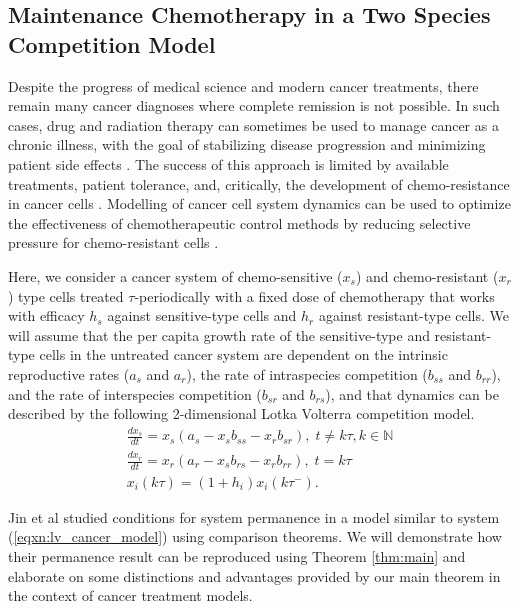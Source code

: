 \documentclass{article}
\theoremstyle{definition}
\newcommand{\N}{{\mathbb{N}}}
\begin{document}
\subsection{Maintenance Chemotherapy in a Two Species Competition Model}
Despite the progress of medical science and modern cancer treatments, there remain many cancer diagnoses where complete remission is not possible. In such cases, drug and radiation therapy can sometimes be used to manage cancer as a chronic illness, with the goal of stabilizing disease progression and minimizing patient side effects \cite{lee_maintenance_chemo_2014}. The success of this approach is limited by available treatments, patient tolerance, and, critically, the development of chemo-resistance in cancer cells \cite{strobl_cost_of_resistance_2021, enriquez_adaptivetherapy_2015}. Modelling of cancer cell system dynamics can be used to optimize the effectiveness of chemotherapeutic control methods by reducing selective pressure for chemo-resistant cells \cite{butner_mathematical_oncology_2022,kozlowska_maintenance_chem_2024,barbolosi_computation_oncology_2016}. 

Here, we consider a cancer system of chemo-sensitive ($x_s$) and chemo-resistant ($x_r$) type cells treated $\tau$-periodically with a fixed dose of chemotherapy that works with efficacy $h_s$ against sensitive-type cells and $h_r$ against resistant-type cells. We will assume that the per capita growth rate of the sensitive-type and resistant-type cells in the untreated cancer system are dependent on the intrinsic reproductive rates ($a_s$ and $a_r$), the rate of intraspecies competition ($b_{ss}$ and $b_{rr}$), and the rate of interspecies competition ($b_{sr}$ and $b_{rs}$), and that dynamics can be described by the following 2-dimensional Lotka Volterra competition model.
\begin{equation}\label{eqxn:lv_cancer_model}
\begin{split}    
\frac{d x_s}{d t} = x_s(a_s - x_sb_{ss} - x_rb_{sr}), \; t \neq k\tau, k \in \N \\
\frac{dx_r}{dt} = x_r(a_r - x_sb_{rs} - x_rb_{rr}),  \; t = k\tau\\
x_i(k\tau)= (1 + h_i)x_i(k\tau^-). 
\end{split}
\end{equation}

Jin et al \cite{jin_persistence_2005} studied conditions for system permanence in a model similar to system (\ref{eqxn:lv_cancer_model}) using comparison theorems. We will demonstrate how their permanence result can be reproduced using Theorem \ref{thm:main} and elaborate on some distinctions and advantages provided by our main theorem in the context of cancer treatment models.
\end{document}
